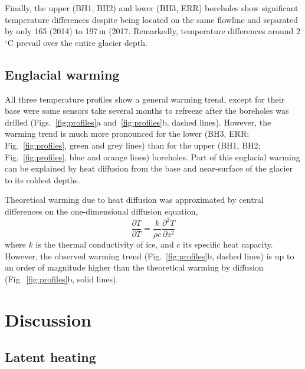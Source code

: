 \documentclass[utf8]{article}
\begin{document}
    Finally, the upper (BH1, BH2) and lower (BH3, ERR) boreholes show
    significant temperature differences despite being located on the same
    flowline and separated by only 165 (2014) to 197\,m (2017. Remarkedly,
    temperature differences
    around 2$^\circ$C prevail over the entire glacier depth.


\subsection{Englacial warming}

    All three temperature profiles show a general warming trend, except for
    their base were some sensors take several months to refreeze after the
    boreholes was drilled (Figs.~\ref{fig:profiles}a and~\ref{fig:profiles}b,
    dashed lines). However, the warming trend is much more pronounced for the
    lower (BH3, ERR; Fig.~\ref{fig:profiles}, green and grey lines) than for
    the upper (BH1, BH2; Fig.~\ref{fig:profiles}, blue and orange lines)
    boreholes. Part of this
    englacial warming can be explained by heat diffusion from the base and
    near-surface of the glacier to its coldest depths.

    Theoretical warming due to heat diffusion was approximated by central
    differences on the one-dimensional diffusion equation,
    \begin{equation}
      \frac{\partial T}{\partial T} =
        \frac{k}{\rho c} \frac{\partial^2 T}{\partial z^2}
    \end{equation}
    where $k$ is the thermal conductivity of ice, and $c$ its specific heat
    capacity. However, the observed warming trend (Fig.~\ref{fig:profiles}b,
    dashed lines) is up to an order of magnitude higher than the theoretical
    warming by diffusion (Fig.~\ref{fig:profiles}b, solid lines).


\section{Discussion}

\subsection{Latent heating}
\end{document}
